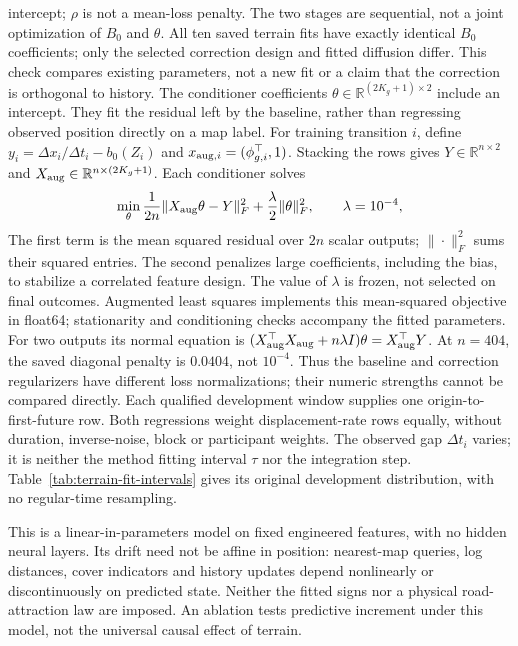 \documentclass[11pt]{article}
\newcommand{\R}{\mathbb{R}}
\begin{document}
intercept; \(\rho\) is not a mean-loss penalty. The two stages are sequential,
not a joint optimization of \(B_0\) and \(\theta\). All ten saved terrain fits
have exactly identical \(B_0\) coefficients; only the selected correction
design and fitted diffusion differ. This check compares existing parameters,
not a new fit or a claim that the correction is orthogonal to history.
The conditioner coefficients \(\theta\in\R^{(2K_g+1)\times2}\)
include an intercept. They fit the residual left by the baseline, rather than
regressing observed position directly on a map label.
For training transition \(i\), define
\(y_i=\Delta x_i/\Delta t_i-b_0(Z_i)\) and
\(x_{{\rm aug},i}=(\phi_{g,i}^\top,1)\).
Stacking the rows gives \(Y\in\R^{n\times2}\) and
\(X_{\rm aug}\in\R^{n\times(2K_g+1)}\).
Each conditioner solves
\begin{equation}
 \min_\theta\frac{1}{2n}\|X_{\rm aug}\theta-Y\|_F^2
       +\frac{\lambda}{2}\|\theta\|_F^2,\qquad\lambda=10^{-4},
 \label{eq:conditioner-fit}
\end{equation}
The first term is the mean squared residual over \(2n\) scalar outputs;
\(\|\cdot\|_F^2\) sums their squared entries. The second penalizes large
coefficients, including the bias, to stabilize a correlated feature design.
The value of \(\lambda\) is frozen, not selected on final outcomes.
Augmented least squares implements this mean-squared objective in float64;
stationarity and conditioning checks accompany the fitted parameters.
For two outputs its normal equation is
\((X_{\rm aug}^\top X_{\rm aug}+n\lambda I)\theta=X_{\rm aug}^\top Y\).
At \(n=404\), the saved diagonal penalty is \(0.0404\), not \(10^{-4}\).
Thus the baseline and correction regularizers have different loss
normalizations; their numeric strengths cannot be compared directly.
Each qualified development window supplies one origin-to-first-future row.
Both regressions weight displacement-rate rows equally, without duration,
inverse-noise, block or participant weights. The observed gap
\(\Delta t_i\) varies; it is neither the method fitting interval \(\tau\)
nor the integration step. Table~\ref{tab:terrain-fit-intervals} gives its
original development distribution, with no regular-time resampling.

This is a linear-in-parameters model on fixed engineered features, with no
hidden neural layers. Its drift need not be affine in position: nearest-map
queries, log distances, cover indicators and history updates depend
nonlinearly or discontinuously on predicted state. Neither the fitted signs
nor a physical road-attraction law are imposed. An ablation tests predictive
increment under this model, not the universal causal effect of terrain.
\end{document}
